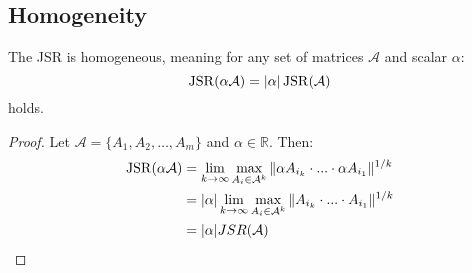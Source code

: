 \subsection*{Homogeneity}
\begin{proposition}
    The JSR is homogeneous, meaning for any set of matrices $\mathcal{A}$ and scalar $\alpha$: 
    \begin{equation}
        \operatorname{JSR}(\alpha \mathcal{A}) = |\alpha| \operatorname{JSR}(\mathcal{A})
    \end{equation}
    holds.
\end{proposition}
\begin{proof}
    Let $\mathcal{A} = \{A_1, A_2, \dots, A_m\}$ and $\alpha \in \mathbb{R}$. Then:
    \begin{align*}
        \operatorname{JSR}(\alpha \mathcal{A}) & = \lim_{k \to \infty} \max_{A_i \in \mathcal{A}^k} \|\alpha A_{i_k} \cdot ... \cdot \alpha A_{i_1}\|^{1/k} \\
        & = |\alpha| \lim_{k \to \infty} \max_{A_i \in \mathcal{A}^k} \|A_{i_k} \cdot ... \cdot A_{i_1}\|^{1/k} \\
        & = |\alpha| JSR(\mathcal{A}) \\
    \end{align*}
\end{proof}

